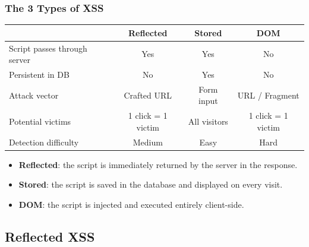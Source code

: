 \documentclass{beamer}
\def\emptyline{\vspace{10pt}}
\begin{document}
\begin{frame}
\frametitle{The 3 Types of XSS}

\begin{scriptsize}
\begin{tabular}{|p{3.2cm}|c|c|c|}
\hline
& \textbf{Reflected} & \textbf{Stored} & \textbf{DOM} \\
\hline
Script passes through server & Yes & Yes & \alert{No} \\
\hline
Persistent in DB & No & \alert{Yes} & No \\
\hline
Attack vector & Crafted URL & Form input & URL / Fragment \\
\hline
Potential victims & 1 click = 1 victim & All visitors & 1 click = 1 victim \\
\hline
Detection difficulty & Medium & Easy & Hard \\
\hline
\end{tabular}
\end{scriptsize}

\emptyline
\begin{itemize}
\item \textbf{Reflected}: the script is immediately returned by the server in the response.
\item \textbf{Stored}: the script is saved in the database and displayed on every visit.
\item \textbf{DOM}: the script is injected and executed entirely client-side.
\end{itemize}
\end{frame}


\subsection{Reflected XSS}
\end{document}
